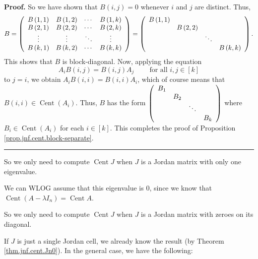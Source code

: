 \documentclass[numbers=enddot,12pt,final,onecolumn,notitlepage]{scrartcl}%
\numberwithin{exer}{subsection}
\theoremstyle{definition}
\newenvironment{proof}[1][Proof]{\noindent\textbf{#1.} }{\ \rule{0.5em}{0.5em}}
\begin{document}
\begin{proof}
So we have shown that $B\left(  i,j\right)  =0$ whenever $i$ and $j$ are
distinct. Thus,%
\[
B=\left(
\begin{array}
[c]{cccc}%
B\left(  1,1\right)  & B\left(  1,2\right)  & \cdots & B\left(  1,k\right) \\
B\left(  2,1\right)  & B\left(  2,2\right)  & \cdots & B\left(  2,k\right) \\
\vdots & \vdots & \ddots & \vdots\\
B\left(  k,1\right)  & B\left(  k,2\right)  & \cdots & B\left(  k,k\right)
\end{array}
\right)  =\left(
\begin{array}
[c]{cccc}%
B\left(  1,1\right)  &  &  & \\
& B\left(  2,2\right)  &  & \\
&  & \ddots & \\
&  &  & B\left(  k,k\right)
\end{array}
\right)  .
\]
This shows that $B$ is block-diagonal. Now, applying the equation%
\[
A_{i}B\left(  i,j\right)  =B\left(  i,j\right)  A_{j}%
\ \ \ \ \ \ \ \ \ \ \text{for all }i,j\in\left[  k\right]
\]
to $j=i$, we obtain $A_{i}B\left(  i,i\right)  =B\left(  i,i\right)  A_{i}$,
which of course means that $B\left(  i,i\right)  \in\operatorname*{Cent}%
\left(  A_{i}\right)  $. Thus, $B$ has the form $\left(
\begin{array}
[c]{cccc}%
B_{1} &  &  & \\
& B_{2} &  & \\
&  & \ddots & \\
&  &  & B_{k}%
\end{array}
\right)  $ where $B_{i}\in\operatorname*{Cent}\left(  A_{i}\right)  $ for each
$i\in\left[  k\right]  $. This completes the proof of Proposition
\ref{prop.jnf.cent.block-separate}.
\end{proof}

So we only need to compute $\operatorname*{Cent}J$ when $J$ is a Jordan matrix
with only one eigenvalue.

We can WLOG assume that this eigenvalue is $0$, since we know that
$\operatorname*{Cent}\left(  A-\lambda I_{n}\right)  =\operatorname*{Cent}A$.

So we only need to compute $\operatorname*{Cent}J$ when $J$ is a Jordan matrix
with zeroes on its diagonal.

If $J$ is just a single Jordan cell, we already know the result (by Theorem
\ref{thm.jnf.cent.Jn0}). In the general case, we have the following:
\end{document}
